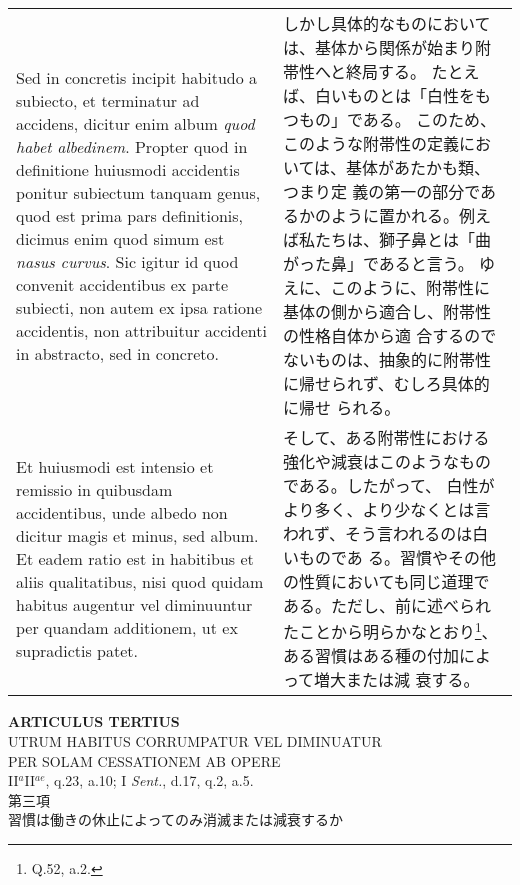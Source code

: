 \documentclass[10pt]{jsarticle} %
\begin{document}
\begin{longtable}{p{21em}p{21em}}
\\

Sed in concretis incipit
habitudo a subiecto, et terminatur ad accidens, dicitur enim album
{\itshape quod habet albedinem}. 
Propter quod in definitione huiusmodi accidentis
ponitur subiectum tanquam genus, quod est prima pars definitionis,
dicimus enim quod simum est {\itshape nasus curvus}. Sic igitur id quod convenit
accidentibus ex parte subiecti, non autem ex ipsa ratione accidentis,
non attribuitur accidenti in abstracto, sed in concreto. 

&

しかし具体的なものにおいては、基体から関係が始まり附帯性へと終局する。
 たとえば、白いものとは「白性をもつもの」である。
このため、このような附帯性の定義においては、基体があたかも類、つまり定
 義の第一の部分であるかのように置かれる。例えば私たちは、獅子鼻とは「曲
 がった鼻」であると言う。
ゆえに、このように、附帯性に基体の側から適合し、附帯性の性格自体から適
 合するのでないものは、抽象的に附帯性に帰せられず、むしろ具体的に帰せ
 られる。

\\


Et huiusmodi
est intensio et remissio in quibusdam accidentibus, unde albedo non
dicitur magis et minus, sed album. Et eadem ratio est in habitibus et
aliis qualitatibus, nisi quod quidam habitus augentur vel diminuuntur
per quandam additionem, ut ex supradictis patet.

&

そして、ある附帯性における強化や減衰はこのようなものである。したがって、
 白性がより多く、より少なくとは言われず、そう言われるのは白いものであ
 る。習慣やその他の性質においても同じ道理である。ただし、前に述べられ
 たことから明らかなとおり\footnote{Q.52, a.2.}、ある習慣はある種の付加によって増大または減
 衰する。




\end{longtable}
\newpage



\begin{center}
{\Large {\bf ARTICULUS TERTIUS}}\\
{\large UTRUM HABITUS CORRUMPATUR VEL DIMINUATUR\\PER SOLAM
 CESSATIONEM AB OPERE }\\
{\footnotesize II$^{a}$II$^{ae}$, q.23, a.10; I {\itshape Sent.}, d.17,
 q.2, a.5.}\\
{\Large 第三項\\習慣は働きの休止によってのみ消滅または減衰するか}
\end{center}
\end{document}
